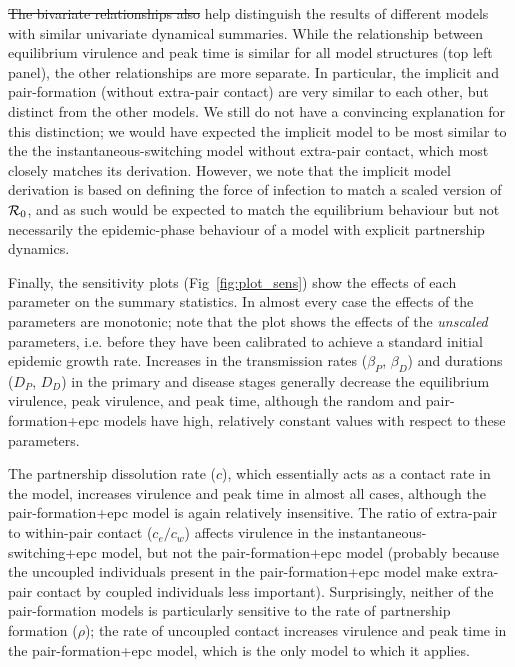 \documentclass[10pt,letterpaper]{article}
\renewcommand{\figurename}{Fig}
\newcommand{\rzero}{{\mathcal R}_0}
\providecommand{\DIFaddtex}[1]{{\protect\color{blue}\uwave{#1}}} %
\providecommand{\DIFdeltex}[1]{{\protect\color{red}\sout{#1}}}                      %
\providecommand{\DIFaddbegin}{} %
\providecommand{\DIFaddend}{} %
\providecommand{\DIFdelbegin}{} %
\providecommand{\DIFdelend}{} %
\providecommand{\DIFadd}[1]{\texorpdfstring{\DIFaddtex{#1}}{#1}} %
\providecommand{\DIFdel}[1]{\texorpdfstring{\DIFdeltex{#1}}{}} %
\newcommand{\DIFscaledelfig}{0.5}
\newlength{\DIFdelgraphicswidth} %
\newlength{\DIFdelgraphicsheight} %
\newcommand{\DIFaddincludegraphics}[2][]{{\color{blue}\fbox{\DIFOincludegraphics[#1]{#2}}}} %
\newcommand{\DIFdelincludegraphics}[2][]{%
\sbox{\DIFdelgraphicsbox}{\DIFOincludegraphics[#1]{#2}}%
\settoboxwidth{\DIFdelgraphicswidth}{\DIFdelgraphicsbox} %
\settoboxtotalheight{\DIFdelgraphicsheight}{\DIFdelgraphicsbox} %
\scalebox{\DIFscaledelfig}{%
\parbox[b]{\DIFdelgraphicswidth}{\usebox{\DIFdelgraphicsbox}\\[-\baselineskip] \rule{\DIFdelgraphicswidth}{0em}}\llap{\resizebox{\DIFdelgraphicswidth}{\DIFdelgraphicsheight}{%
\setlength{\unitlength}{\DIFdelgraphicswidth}%
\begin{picture}(1,1)%
\thicklines\linethickness{2pt} %
{\color[rgb]{1,0,0}\put(0,0){\framebox(1,1){}}}%
{\color[rgb]{1,0,0}\put(0,0){\line( 1,1){1}}}%
{\color[rgb]{1,0,0}\put(0,1){\line(1,-1){1}}}%
\end{picture}%
}\hspace*{3pt}}} %
} %
\DeclareRobustCommand{\DIFaddbegin}{\DIFOaddbegin \let\includegraphics\DIFaddincludegraphics} %
\DeclareRobustCommand{\DIFaddend}{\DIFOaddend \let\includegraphics\DIFOincludegraphics} %
\DeclareRobustCommand{\DIFdelbegin}{\DIFOdelbegin \let\includegraphics\DIFdelincludegraphics} %
\DeclareRobustCommand{\DIFdelend}{\DIFOaddend \let\includegraphics\DIFOincludegraphics} %
\begin{document}
\DIFdel{The bivariate relationships also }\DIFdelend help distinguish the results of 
different models with similar univariate dynamical summaries. While the
relationship between equilibrium virulence and peak time is
similar for all model structures (top left panel), the other
relationships are more separate. In particular, the implicit
and pair-formation (without extra-pair contact) are very similar
to each other, but distinct from the other models. We still do
not have a convincing explanation for this distinction; we
would have expected the implicit model to be most similar to the
the instantaneous-switching model without extra-pair contact,
which most closely matches its derivation. However, we note
that the implicit model derivation is based on defining
the force of infection to match a scaled version of \DIFdelbegin \DIFdel{${\cal R}_0$}\DIFdelend \DIFaddbegin \DIFadd{$\rzero$}\DIFaddend ,
and as such would be expected to match the equilibrium behaviour
but not necessarily the epidemic-phase behaviour of a model
with explicit partnership dynamics.

Finally, the sensitivity plots (\figurename~\ref{fig:plot_sens}) show the effects 
of each parameter on the summary statistics. In almost every case the
effects of the parameters are monotonic; note that
the plot shows the effects of the \emph{unscaled} parameters, i.e.
before they have been calibrated to achieve a standard initial epidemic
growth rate.
Increases in the transmission rates ($\beta_P$, $\beta_D$)
and durations ($D_P$, $D_D$) in the primary and disease stages generally
decrease the equilibrium virulence, peak virulence, and peak time,
although the random and pair-formation+epc 
models have high, relatively
constant values with respect to these parameters. 

The partnership dissolution rate ($c$), which essentially
acts as a contact rate in the model,
increases virulence and peak time in almost all
cases, although the pair-formation+epc
model is again relatively insensitive.
The ratio of extra-pair to within-pair contact ($c_e/c_w$) affects
virulence in the instantaneous-switching+epc model, but not the pair-formation+epc
model (probably because the uncoupled individuals present in the pair-formation+epc
model make extra-pair contact by coupled individuals less important).
Surprisingly, neither of the pair-formation models is particularly sensitive to the 
rate of partnership formation ($\rho$); the rate of uncoupled contact
increases virulence and peak time in the pair-formation+epc model, 
which is the only model to which it applies.
\end{document}

